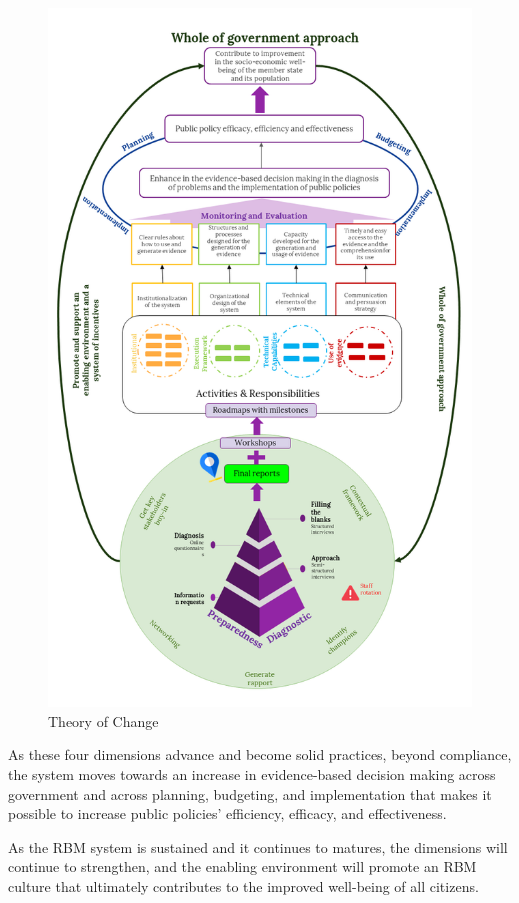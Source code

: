 \documentclass[
]{book}
\begin{document}
\begin{figure}
\includegraphics[width=1\linewidth]{./images/figure_1} \caption{Theory of Change}\label{fig:figure1}
\end{figure}

As these four dimensions advance and become solid practices, beyond compliance, the system moves towards an increase in evidence-based decision making across government and across planning, budgeting, and implementation that makes it possible to increase public policies' efficiency, efficacy, and effectiveness.

As the RBM system is sustained and it continues to matures, the dimensions will continue to strengthen, and the enabling environment will promote an RBM culture that ultimately contributes to the improved well-being of all citizens.
\end{document}
